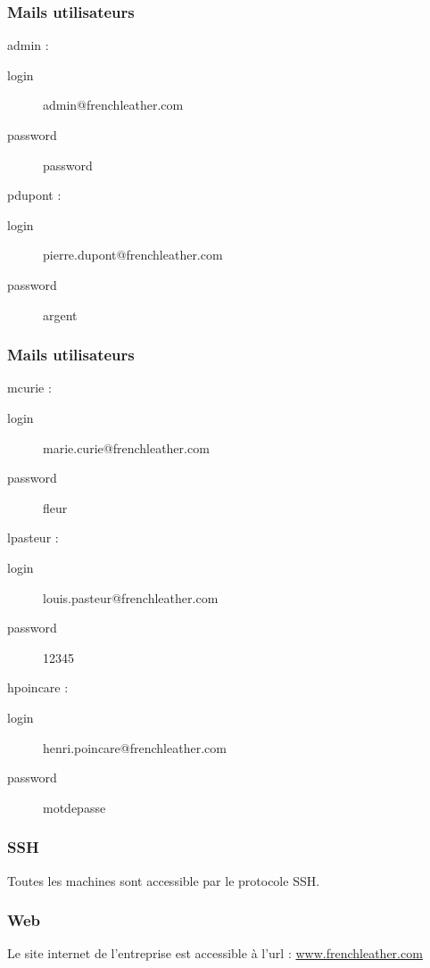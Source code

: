 \documentclass{beamer}
\begin{document}
		\begin{frame}
			\frametitle{Mails utilisateurs}
			\begin{alertblock}{admin :}
				\begin{description}
					\item[login] admin@frenchleather.com
					\item[password] password
				\end{description}
			\end{alertblock}
			\begin{alertblock}{pdupont :}
				\begin{description}
					\item[login] pierre.dupont@frenchleather.com
					\item[password] argent
				\end{description}
			\end{alertblock}
		\end{frame}
		\begin{frame}
			\frametitle{Mails utilisateurs}
			\begin{alertblock}{mcurie :}
				\begin{description}
					\item[login] marie.curie@frenchleather.com
					\item[password] fleur
				\end{description}
			\end{alertblock}
			\begin{alertblock}{lpasteur :}
				\begin{description}
					\item[login] louis.pasteur@frenchleather.com
					\item[password] 12345
				\end{description}
			\end{alertblock}
			\begin{alertblock}{hpoincare :}
				\begin{description}
					\item[login] henri.poincare@frenchleather.com
					\item[password] motdepasse
				\end{description}
			\end{alertblock}
		\end{frame}
		\begin{frame}
			\frametitle{SSH}
			Toutes les machines sont accessible par le protocole SSH.
		\end{frame}
		\begin{frame}
			\frametitle{Web}
			Le site internet de l'entreprise est accessible à l'url : \url{www.frenchleather.com}
		\end{frame}
\end{document}
